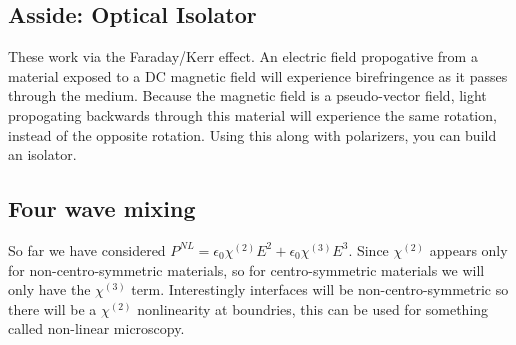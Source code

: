 \subsection*{Asside: Optical Isolator}
These work via the Faraday/Kerr effect. An electric field propogative from a material exposed to a DC magnetic field will experience birefringence as it passes through the medium.
Because the magnetic field is a pseudo-vector field, light propogating backwards through this material will experience the same rotation, instead of the opposite rotation. Using this along with polarizers, you can build an isolator.
\subsection{Four wave mixing}
So far we have considered $P^{NL} = \epsilon_0\chi^{(2)} E^2 + \epsilon_0\chi^{(3)} E^3$. Since $\chi^{(2)}$ appears only for non-centro-symmetric materials, so for centro-symmetric materials we will only have the $\chi^{(3)}$ term.
Interestingly interfaces will be non-centro-symmetric so there will be a $\chi^{(2)}$ nonlinearity at boundries, this can be used for something called non-linear microscopy.

